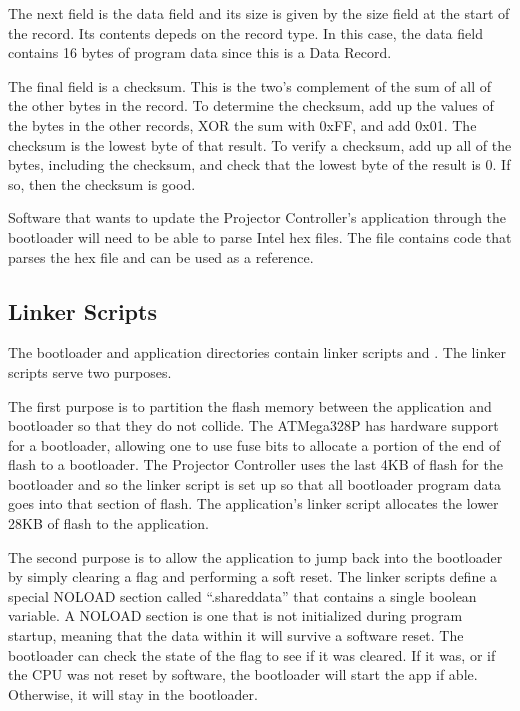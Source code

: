 \documentclass{article}
\begin{document}
The next field is the data field and its size is given by the size field at the start of the
record.  Its contents depeds on the record type.  In this case, the data field contains 16 bytes of
program data since this is a Data Record.

The final field is a checksum.  This is the two's complement of the sum of all of the other bytes in
the record.  To determine the checksum, add up the values of the bytes in the other records, XOR the
sum with 0xFF, and add 0x01.  The checksum is the lowest byte of that result.  To verify a checksum,
add up all of the bytes, including the checksum, and check that the lowest byte of the result is 0.
If so, then the checksum is good.

Software that wants to update the Projector Controller's application through the bootloader will
need to be able to parse Intel hex files.  The file  contains code
that parses the hex file and can be used as a reference.

\subsection{Linker Scripts} \label{ssec:FWLinkerScripts}
The bootloader and application directories contain linker scripts  and
.  The linker scripts serve two purposes.

The first purpose is to partition the flash memory between the application and bootloader so that
they do not collide.  The ATMega328P has hardware support for a bootloader, allowing one to use fuse
bits to allocate a portion of the end of flash to a bootloader.  The Projector Controller uses the
last 4KB of flash for the bootloader and so the linker script is set up so that all bootloader
program data goes into that section of flash.  The application's linker script allocates the lower
28KB of flash to the application.

The second purpose is to allow the application to jump back into the bootloader by simply clearing a
flag and performing a soft reset.  The linker scripts define a special NOLOAD section called
``.shareddata'' that contains a single boolean variable.  A NOLOAD section is one that is not
initialized during program startup, meaning that the data within it will survive a software reset.
The bootloader can check the state of the flag to see if it was cleared.  If it was, or if the CPU
was not reset by software, the bootloader will start the app if able.  Otherwise, it will stay in
the bootloader.
\end{document}

